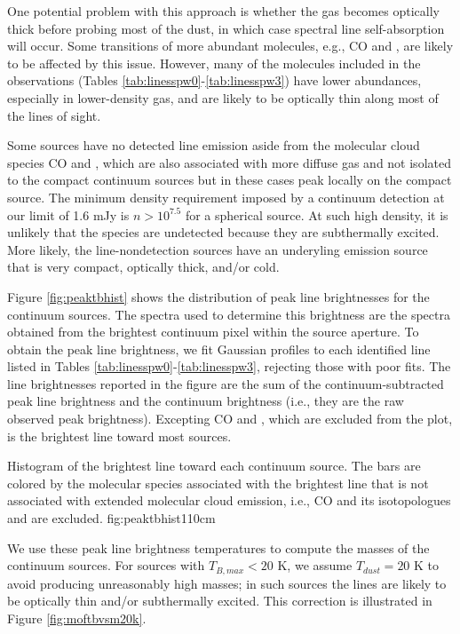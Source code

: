 \documentclass{emulateapj}
\begin{document}
One potential problem with this approach is whether the gas becomes optically thick
before probing most of the dust, in which case spectral line self-absorption
will occur.  Some transitions of more abundant molecules, e.g., CO and
\formaldehyde, are likely to be affected by this issue.  However, many of the
molecules included in the observations (Tables
\ref{tab:linesspw0}-\ref{tab:linesspw3}) have lower abundances, especially in
lower-density gas, and are likely to be optically thin along most of the lines
of sight.

Some sources have no detected line emission aside from the molecular cloud
species CO and \formaldehyde, which are also associated with more diffuse gas
and not isolated to the compact continuum sources but in these cases peak
locally on the compact source.  The minimum density requirement imposed by a
continuum detection at our limit of 1.6 mJy is $n>10^{7.5}$ \percc for a
spherical source.  At such high density, it is unlikely that the species are
undetected because they are subthermally excited.  More likely, the
line-nondetection sources have an underyling emission source that is very
compact, optically thick, and/or cold.

Figure \ref{fig:peaktbhist} shows the distribution of peak line brightnesses
for the continuum sources.  The spectra used to determine this brightness are
the spectra obtained from the brightest continuum pixel within the source
aperture.  To obtain the peak line brightness, we fit Gaussian profiles to each
identified line listed in Tables \ref{tab:linesspw0}-\ref{tab:linesspw3},
rejecting those with poor fits.  The line brightnesses reported in the figure
are the sum of the continuum-subtracted peak line brightness and the continuum
brightness (i.e., they are the raw observed peak brightness).  Excepting CO and
\formaldehyde, which are excluded from the plot, \methanol is the brightest
line toward most sources. 

{Histogram of the brightest line toward each continuum source.
The bars are colored by the molecular species associated with the brightest
line that is not associated with extended molecular cloud emission,
i.e., CO and its isotopologues and \formaldehyde are excluded.}
{fig:peaktbhist}{1}{10cm}

We use these peak line brightness temperatures to compute the masses of the
continuum sources.  For sources with $T_{B,max} < 20$ K, we assume $T_{dust} =
20$ K to avoid producing unreasonably high masses; in such sources the lines
are likely to be optically thin and/or subthermally excited.  This correction is
illustrated in Figure \ref{fig:moftbvsm20k}.
\end{document}
